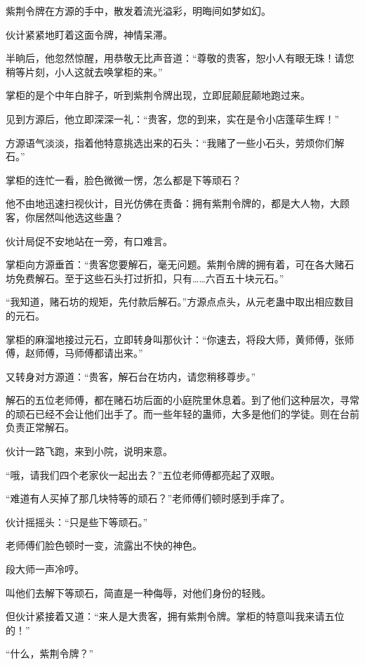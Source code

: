 
\begin{this_body}

紫荆令牌在方源的手中，散发着流光溢彩，明晦间如梦如幻。

伙计紧紧地盯着这面令牌，神情呆滞。

半晌后，他忽然惊醒，用恭敬无比声音道：“尊敬的贵客，恕小人有眼无珠！请您稍等片刻，小人这就去唤掌柜的来。”

掌柜的是个中年白胖子，听到紫荆令牌出现，立即屁颠屁颠地跑过来。

见到方源后，他立即深深一礼：“贵客，您的到来，实在是令小店蓬荜生辉！”

方源语气淡淡，指着他特意挑选出来的石头：“我赌了一些小石头，劳烦你们解石。”

掌柜的连忙一看，脸色微微一愣，怎么都是下等顽石？

他不由地迅速扫视伙计，目光仿佛在责备：拥有紫荆令牌的，都是大人物，大顾客，你居然叫他选这些蛊？

伙计局促不安地站在一旁，有口难言。

掌柜向方源垂首：“贵客您要解石，毫无问题。紫荆令牌的拥有着，可在各大赌石坊免费解石。至于这些石头打过折扣，只有……六百五十块元石。”

“我知道，赌石坊的规矩，先付款后解石。”方源点点头，从元老蛊中取出相应数目的元石。

掌柜的麻溜地接过元石，立即转身叫那伙计：“你速去，将段大师，黄师傅，张师傅，赵师傅，马师傅都请出来。”

又转身对方源道：“贵客，解石台在坊内，请您稍移尊步。”

解石的五位老师傅，都在赌石坊后面的小庭院里休息着。到了他们这种层次，寻常的顽石已经不会让他们出手了。而一些年轻的蛊师，大多是他们的学徒。则在台前负责正常解石。

伙计一路飞跑，来到小院，说明来意。

“哦，请我们四个老家伙一起出去？”五位老师傅都亮起了双眼。

“难道有人买掉了那几块特等的顽石？”老师傅们顿时感到手痒了。

伙计摇摇头：“只是些下等顽石。”

老师傅们脸色顿时一变，流露出不快的神色。

段大师一声冷哼。

叫他们去解下等顽石，简直是一种侮辱，对他们身份的轻贱。

但伙计紧接着又道：“来人是大贵客，拥有紫荆令牌。掌柜的特意叫我来请五位的！”

“什么，紫荆令牌？”


\end{this_body}
